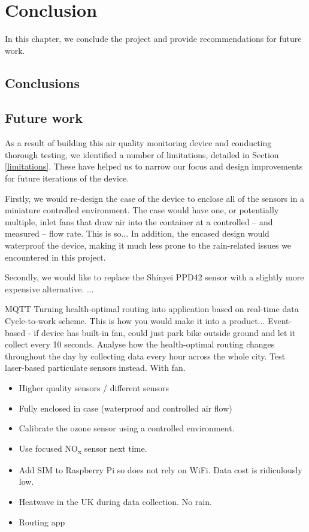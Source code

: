 \documentclass[11pt]{report}
\begin{document}
\chapter{Conclusion} \label{chap: conclusion}

In this chapter, we conclude the project and provide recommendations for future work.

\section{Conclusions}

\section{Future work}

As a result of building this air quality monitoring device and conducting thorough testing, we identified a number of limitations, detailed in Section \ref{limitations}. These have helped us to narrow our focus and design improvements for future iterations of the device.

Firstly, we would re-design the case of the device to enclose all of the sensors in a miniature controlled environment. The case would have one, or potentially multiple, inlet fans that draw air into the container at a controlled -- and measured -- flow rate. This is so... In addition, the encased design would waterproof the device, making it much less prone to the rain-related issues we encountered in this project.

Secondly, we would like to replace the Shinyei PPD42 sensor with a slightly more expensive alternative. ...

MQTT
Turning health-optimal routing into application based on real-time data
Cycle-to-work scheme.
This is how you would make it into a product...
Event-based - if device has built-in fan, could just park bike outside ground and let it collect every 10 seconds.
Analyse how the health-optimal routing changes throughout the day by collecting data every hour across the whole city.
Test laser-based particulate sensors instead. With fan.


\begin{itemize}
\item Higher quality sensors / different sensors
\item Fully enclosed in case (waterproof and controlled air flow)
\item Calibrate the ozone sensor using a controlled environment.
\item Use focused NO\textsubscript{x} sensor next time.
\item Add SIM to Raspberry Pi so does not rely on WiFi. Data cost is ridiculously low.
\item Heatwave in the UK during data collection. No rain.
\item Routing app
\end{itemize}
\end{document}
